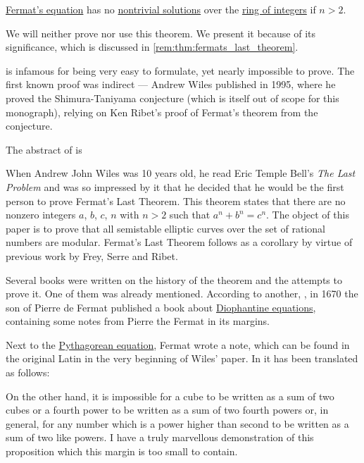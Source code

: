 \begin{theorem}\label{thm:fermats_last_theorem}
  \hyperref[def:fermats_equation]{Fermat's equation} has no \hyperref[def:algebraic_equation]{nontrivial solutions} over the \hyperref[def:integers]{ring of integers} if \( n > 2 \).
\end{theorem}
\begin{comments}
  \item We will neither prove nor use this theorem. We present it because of its significance, which is discussed in \cref{rem:thm:fermats_last_theorem}.
\end{comments}

\begin{remark}\label{rem:thm:fermats_last_theorem}
   is infamous for being very easy to formulate, yet nearly impossible to prove. The first known proof was indirect --- Andrew Wiles published \cite{Wiles1995FermatsTheorem} in 1995, where he proved the Shimura-Taniyama conjecture (which is itself out of scope for this monograph), relying on Ken Ribet's proof of Fermat's theorem from the conjecture.

  The abstract of \cite{Wiles1995FermatsTheorem} is
  \begin{displayquote}
    When Andrew John Wiles was 10 years old, he read Eric Temple Bell's \textit{The Last Problem} and was so impressed by it that he decided that he would be the first person to prove Fermat's Last Theorem. This theorem states that there are no nonzero integers \( a \), \( b \), \( c \), \( n \) with \( n > 2 \) such that \( a^n + b^n = c^n \). The object of this paper is to prove that all semistable elliptic curves over the set of rational numbers are modular. Fermat's Last Theorem follows as a corollary by virtue of previous work by Frey, Serre and Ribet.
  \end{displayquote}

  Several books were written on the history of the theorem and the attempts to prove it. One of them was already mentioned. According to another, , in 1670 the son of Pierre de Fermat published a book about \hyperref[def:diophantine_equation]{Diophantine equations}, containing some notes from Pierre the Fermat in its margins.

  Next to the \hyperref[def:fermats_equation]{Pythagorean equation}, Fermat wrote a note, which can be found in the original Latin in the very beginning of Wiles' paper. In \cite[210]{Stillwell2010MathHistory} it has been translated as follows:
  \begin{displayquote}
    On the other hand, it is impossible for a cube to be written as a sum of two cubes or a fourth power to be written as a sum of two fourth powers or, in general, for any number which is a power higher than second to be written as a sum of two like powers. I have a truly marvellous demonstration of this proposition which this margin is too small to contain.
  \end{displayquote}


\end{remark}
